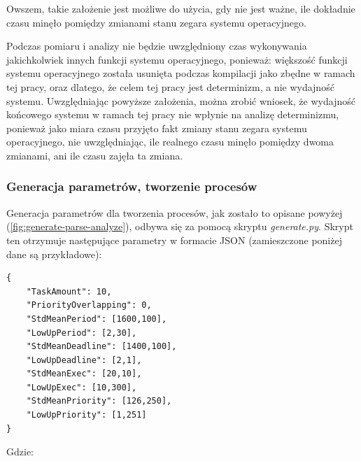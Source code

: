 \documentclass[../../main]{subfiles}
\begin{document}
Owszem, takie założenie jest możliwe do użycia, gdy nie jest ważne, ile dokładnie czasu minęło pomiędzy zmianami stanu zegara systemu operacyjnego.

Podczas pomiaru i analizy nie będzie uwzględniony czas wykonywania jakichkolwiek innych funkcji systemu operacyjnego, ponieważ: większość funkcji systemu operacyjnego została usunięta podczas kompilacji jako zbędne w ramach tej pracy, oraz dlatego, że celem tej pracy jest determinizm, a nie wydajność systemu. Uwzględniając powyższe założenia, można zrobić wniosek, że wydajność końcowego systemu w ramach tej pracy nie wpłynie na analizę determinizmu, ponieważ jako miara czasu przyjęto fakt zmiany stanu zegara systemu operacyjnego, nie uwzględniając, ile realnego czasu minęło pomiędzy dwoma zmianami, ani ile czasu zajęła ta zmiana.

\subsubsection{Generacja parametrów, tworzenie procesów}

Generacja parametrów dla tworzenia procesów, jak zostało to opisane powyżej (\cref{fig:generate-parse-analyze}), odbywa się za pomocą skryptu \textit{generate.py}. Skrypt ten otrzymuje następujące parametry w formacie JSON (zamieszczone poniżej dane są przykładowe):

\begin{lstlisting}[caption={Parametry wejściowe do generacji}, label={lst:input-generation-parameters}]
{
    "TaskAmount": 10,
    "PriorityOverlapping": 0,
    "StdMeanPeriod": [1600,100],
    "LowUpPeriod": [2,30],
    "StdMeanDeadline": [1400,100],
    "LowUpDeadline": [2,1],
    "StdMeanExec": [20,10],
    "LowUpExec": [10,300],
    "StdMeanPriority": [126,250],
    "LowUpPriority": [1,251]
}
\end{lstlisting}

Gdzie:
\end{document}
